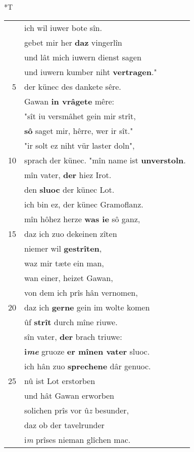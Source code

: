 \documentclass[8pt,a4paper,notitlepage]{article}
\begin{document}
\begin{table}[ht]
\begin{minipage}[t]{0.5\linewidth}
\small
\begin{center}*T
\end{center}
\begin{tabular}{rl}
 & ich wil iuwer bote sîn.\\ 
 & gebet mir her \textbf{daz} vingerlîn\\ 
 & und lât mich iuwern dienst sagen\\ 
 & und iuwern kumber niht \textbf{vertragen}."\\ 
5 & der künec des dankete sêre.\\ 
 & Gawan \textbf{in vrâgete} mêre:\\ 
 & "sît iu versmâhet gein mir strît,\\ 
 & \textbf{sô} saget mir, hêrre, wer ir sît."\\ 
 & "ir solt ez niht vür laster doln",\\ 
10 & sprach der künec. "mîn name ist \textbf{unverstoln}.\\ 
 & mîn vater, \textbf{der} hiez Irot.\\ 
 & den \textbf{sluoc} der künec Lot.\\ 
 & ich bin ez, der künec Gramoflanz.\\ 
 & mîn hôhez herze \textbf{was ie} sô ganz,\\ 
15 & daz ich zuo dekeinen zîten\\ 
 & niemer wil \textbf{gestrîten},\\ 
 & waz mir tæte ein man,\\ 
 & wan einer, heizet Gawan,\\ 
 & von dem ich prîs hân vernomen,\\ 
20 & daz ich \textbf{gerne} gein im wolte komen\\ 
 & ûf \textbf{strît} durch mîne riuwe.\\ 
 & sîn vater, \textbf{der} brach triuwe:\\ 
 & \textbf{i\textit{me}} gruoze \textbf{er mînen vater} sluoc.\\ 
 & ich hân zuo \textbf{sprechene} dâr genuoc.\\ 
25 & nû ist Lot erstorben\\ 
 & und hât Gawan erworben\\ 
 & solichen prîs vor û\textit{z} besunder,\\ 
 & daz ob der tavelrunder\\ 
 & i\textit{m} prîses nieman glîchen mac.\\ 

\end{tabular}
\end{minipage}
\end{table}
\end{document}
